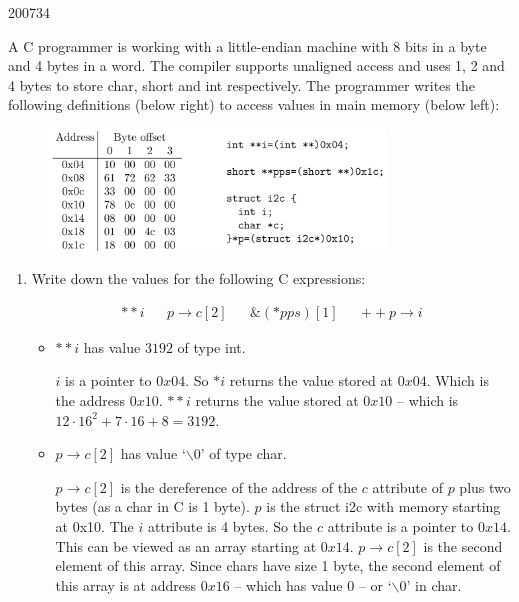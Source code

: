 \documentclass[10pt,\jkfside,a4paper]{article}
\begin{document}
\begin{examquestion}{2007}{3}{4}

A C programmer is working with a little-endian  machine with 8 bits in a 
byte and 4 bytes in a word. The compiler supports unaligned access and uses 
1, 2 and 4 bytes to store char, short and int respectively. The programmer 
writes the following definitions (below right) to access values in main 
memory (below left):

\begin{figure}[H]
    \centering
    \includegraphics[width=0.8\textwidth]{q2_img}
\end{figure}

\begin{enumerate}[label=(\alph*)]

\item Write down the values for the following C expressions:

\begin{align*}
**i & & p\rightarrow c[2] & & \&(*pps)[1] & & ++p\rightarrow i
\end{align*}

\begin{itemize}

\item $**i$ has value $3192$ of type int.

$i$ is a pointer to $0x04$. So $*i$ returns the value stored at $0x04$.
Which is the address $0x10$. $**i$ returns the value stored at $0x10$ --
which is $12 \cdot 16^2 + 7\cdot 16 + 8 = 3192$.

\item $p\rightarrow c[2]$ has value `$\backslash 0$' of type char.

$p\rightarrow c[2]$ is the dereference of the address of the $c$ attribute of
$p$ plus two bytes (as a char in C is 1 byte). $p$ is the struct i2c with
memory starting at 0x10. The $i$ attribute is 4 bytes. So the $c$ attribute
is a pointer to $0x14$. This can be viewed as an array starting at $0x14$.
$p\rightarrow c[2]$ is the second element of this array. Since chars have
size 1 byte, the second element of this array is at address $0x16$ -- which
has value $0$ -- or `$\backslash 0$' in char.


\end{itemize}
\end{enumerate}
\end{examquestion}
\end{document}
